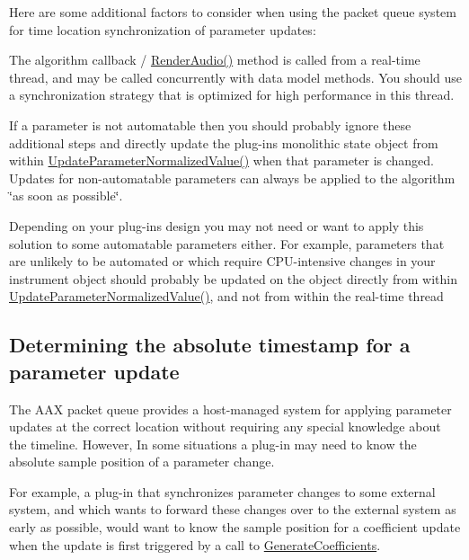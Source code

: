 Here are some additional factors to consider when using the packet queue system for time location synchronization of parameter updates\+: \begin{DoxyItemize}
\item The algorithm callback / \hyperlink{a00026_a04f2f73d70ea28c17747c68fc3a20fc8}{Render\+Audio()} method is called from a real-\/time thread, and may be called concurrently with data model methods. You should use a synchronization strategy that is optimized for high performance in this thread. \item If a parameter is not automatable then you should probably ignore these additional steps and directly update the plug-\/in\textquotesingle{}s monolithic state object from within \hyperlink{a00061_a685858711efb8634ce66c327f2865c71}{Update\+Parameter\+Normalized\+Value()} when that parameter is changed. Updates for non-\/automatable parameters can always be applied to the algorithm \char`\"{}as soon as possible\char`\"{}. \item Depending on your plug-\/in\textquotesingle{}s design you may not need or want to apply this solution to some automatable parameters either. For example, parameters that are unlikely to be automated or which require C\+P\+U-\/intensive changes in your instrument object should probably be updated on the object directly from within \hyperlink{a00061_a685858711efb8634ce66c327f2865c71}{Update\+Parameter\+Normalized\+Value()}, and not from within the real-\/time thread\end{DoxyItemize}
\hypertarget{a00351_parameterUpdateTiming_timestamps}{}\subsection{Determining the absolute timestamp for a parameter update}\label{a00351_parameterUpdateTiming_timestamps}
The A\+A\+X packet queue provides a host-\/managed system for applying parameter updates at the correct location without requiring any special knowledge about the timeline. However, In some situations a plug-\/in may need to know the absolute sample position of a parameter change.

For example, a plug-\/in that synchronizes parameter changes to some external system, and which wants to forward these changes over to the external system as early as possible, would want to know the sample position for a coefficient update when the update is first triggered by a call to \hyperlink{a00061_a083265b008921b6114ede387711694b7}{Generate\+Coefficients}.

